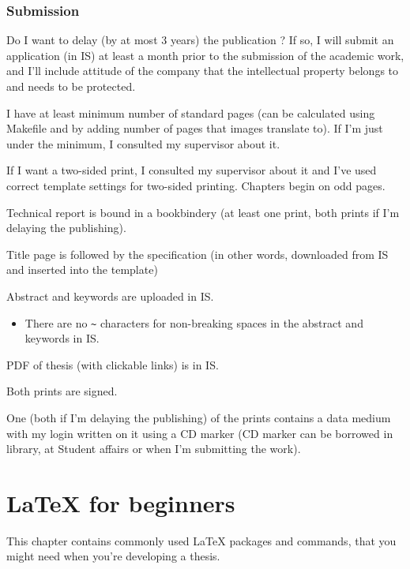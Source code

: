 \subsection*{Submission}
\begin{checklist}
	\item Do I want to delay (by at most 3 years) the publication ? If so, I will submit an application (in IS) at least a month prior to the submission of the academic work, and I'll include attitude of the company that the intellectual property belongs to and needs to be protected.
    \item I have at least minimum number of standard pages (can be calculated using Makefile and by adding number of pages that images translate to). If I'm just under the minimum, I consulted my supervisor about it.
   	\item If I want a two-sided print, I consulted my supervisor about it and I've used correct template settings for two-sided printing. Chapters begin on odd pages.
    \item Technical report is bound in a bookbindery (at least one print, both prints if I'm delaying the publishing).
    \item Title page is followed by the specification (in other words, downloaded from IS and inserted into the template)
    \item Abstract and keywords are uploaded in IS.
      \begin{itemize}
        \item There are no \verb|~| characters for non-breaking spaces in the abstract and keywords in IS.
      \end{itemize}     
    \item PDF of thesis (with clickable links) is in IS.
    \item Both prints are signed.
    \item One (both if I'm delaying the publishing) of the prints contains a data medium with my login written on it using a CD marker (CD marker can be borrowed in library, at Student affairs or when I'm submitting the work).
\end{checklist}

\chapter{\LaTeX{} for beginners}
\label{latex}

This chapter contains commonly used \LaTeX{} packages and commands, that you might need when you're developing a thesis.

